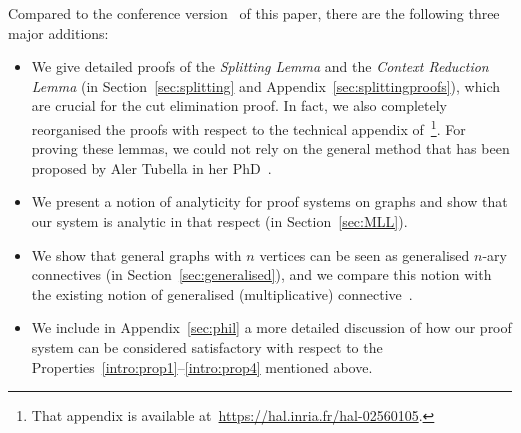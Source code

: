 \documentclass{lmcs} %
\theoremstyle{plain}
\begin{document}
Compared to the conference version~\cite{Acclavio2020} of this paper, there are the following three major additions:
\begin{itemize}
	
\item We give detailed proofs of the \emph{Splitting Lemma} and the
  \emph{Context Reduction Lemma} (in Section~\ref{sec:splitting} and Appendix~\ref{sec:splittingproofs}),
  which are crucial for the cut elimination proof. In fact, we also
  completely reorganised the proofs with respect to the technical
  appendix of~\cite{Acclavio2020}\footnote{That appendix is available
    at~\url{https://hal.inria.fr/hal-02560105}.}.  For proving these
  lemmas, we could not rely on the general method that has been
  proposed by Aler Tubella in her PhD~\cite{tubella:phd}.
\item We present a notion of analyticity for proof systems on graphs and
  show that our system is analytic in that respect (in
  Section~\ref{sec:MLL}).
\item We show that general graphs with $n$ vertices can be seen as
  generalised $n$-ary connectives (in Section~\ref{sec:generalised}),
  and we compare this notion with the existing notion of generalised
  (multiplicative)
  connective~\cite{girard:87:b,danos:regnier:89,mai:19,acc:mai:20}.

\item We include in Appendix~\ref{sec:phil} a more detailed discussion of
  how our proof system can be considered satisfactory with respect to 
  the Properties~\eqref{intro:prop1}--\eqref{intro:prop4} mentioned above.

\end{itemize}

\medskip
\end{document}
